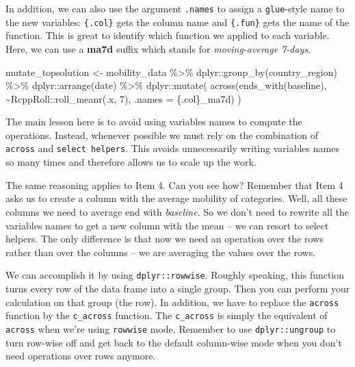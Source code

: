 \documentclass[
]{book}
\newenvironment{Shaded}{\begin{snugshade}}{\end{snugshade}}
\newcommand{\AttributeTok}[1]{\textcolor[rgb]{0.77,0.63,0.00}{#1}}
\newcommand{\DecValTok}[1]{\textcolor[rgb]{0.00,0.00,0.81}{#1}}
\newcommand{\FunctionTok}[1]{\textcolor[rgb]{0.00,0.00,0.00}{#1}}
\newcommand{\NormalTok}[1]{#1}
\newcommand{\OtherTok}[1]{\textcolor[rgb]{0.56,0.35,0.01}{#1}}
\newcommand{\SpecialCharTok}[1]{\textcolor[rgb]{0.00,0.00,0.00}{#1}}
\newcommand{\StringTok}[1]{\textcolor[rgb]{0.31,0.60,0.02}{#1}}
\begin{document}
In addition, we can also use the argument \texttt{.names} to assign a \texttt{glue}-style name to the new variables: \texttt{\{.col\}} gets the column name and \texttt{\{.fun\}} gets the name of the function. This is great to identify which function we applied to each variable. Here, we can use a \textbf{ma7d} suffix which stands for \emph{moving-average 7-days}.

\begin{Shaded}
\begin{Highlighting}[]
\NormalTok{mutate\_topsolution }\OtherTok{\textless{}{-}}\NormalTok{ mobility\_data }\SpecialCharTok{\%\textgreater{}\%} 
\NormalTok{  dplyr}\SpecialCharTok{::}\FunctionTok{group\_by}\NormalTok{(country\_region) }\SpecialCharTok{\%\textgreater{}\%} 
\NormalTok{  dplyr}\SpecialCharTok{::}\FunctionTok{arrange}\NormalTok{(date) }\SpecialCharTok{\%\textgreater{}\%} 
\NormalTok{  dplyr}\SpecialCharTok{::}\FunctionTok{mutate}\NormalTok{(}
    \FunctionTok{across}\NormalTok{(}\FunctionTok{ends\_with}\NormalTok{(}\StringTok{\textquotesingle{}baseline\textquotesingle{}}\NormalTok{), }\SpecialCharTok{\textasciitilde{}}\NormalTok{RcppRoll}\SpecialCharTok{::}\FunctionTok{roll\_meanr}\NormalTok{(.x, }\DecValTok{7}\NormalTok{), }\AttributeTok{.names =} \StringTok{\textquotesingle{}\{.col\}\_ma7d\textquotesingle{}}\NormalTok{)}
\NormalTok{    )}
\end{Highlighting}
\end{Shaded}

The main lesson here is to avoid using variables names to compute the operations. Instead, whenever possible we must rely on the combination of \texttt{across} and \texttt{select\ helpers}. This avoids unnecessarily writing variables names so many times and therefore allows us to scale up the work.

The same reasoning applies to Item 4. Can you see how? Remember that Item 4 asks us to create a column with the average mobility of categories. Well, all these columns we need to average end with \emph{baseline}. So we don't need to rewrite all the variables names to get a new column with the mean -- we can resort to select helpers. The only difference is that now we need an operation over the rows rather than over the columns -- we are averaging the values over the rows.

We can accomplish it by using \texttt{dplyr::rowwise}. Roughly speaking, this function turns every row of the data frame into a single group. Then you can perform your calculation on that group (the row). In addition, we have to replace the \texttt{across} function by the \texttt{c\_across} function. The \texttt{c\_across} is simply the equivalent of \texttt{across} when we're using \texttt{rowwise} mode. Remember to use \texttt{dplyr::ungroup} to turn row-wise off and get back to the default column-wise mode when you don't need operations over rows anymore.
\end{document}

